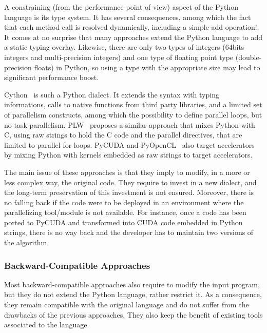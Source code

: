 \documentclass{llncs}
\begin{document}
A constraining (from the performance point of view) aspect of the Python
language is its type system. It has several consequences, among which the fact
that each method call is resolved dynamically, including a simple add
operation! It comes at no surprise that many approaches extend the Python
language to add a static typing overlay. Likewise, there are only two types of
integers (64bits integers and multi-precision integers) and one type of floating
point type (double-precision floats) in Python, so using a type with the
appropriate size may lead to significant performance boost.

Cython~\cite{cython2010} is such a Python dialect. It extends the syntax with
typing informations, calls to native functions from third party libraries, and a
limited set of parallelism constructs, among which the possibility to define
parallel loops, but no task parallelism. PLW~\cite{dongara2007} proposes a
similar approach that mixes Python with C, using raw strings to hold the C code
and the parallel directives, that are limited to parallel for loops.
PyCUDA and PyOpenCL~\cite{klockner2012} also target accelerators by mixing
Python with kernels embedded as raw strings to target accelerators.

The main issue of these approaches is that they imply to modify, in a more or
less complex way, the original code. They require to invest in a new dialect,
and the long-term preservation of this investment is not ensured. Moreover,
there is no falling back if the code were to be deployed in an environment
where the parallelizing tool/module is not available. For instance, once a code
has been ported to PyCUDA and transformed into CUDA code embedded in Python
strings, there is no way back and the developer has to maintain two versions of
the algorithm.

\subsubsection{Backward-Compatible Approaches}

Most backward-compatible approaches also require to modify the input program,
but they do not extend the Python language, rather restrict it. As a
consequence, they remain compatible with the original language and do not suffer
from the drawbacks of the previous approaches. They also keep the benefit of
existing tools associated to the language.
\end{document}
